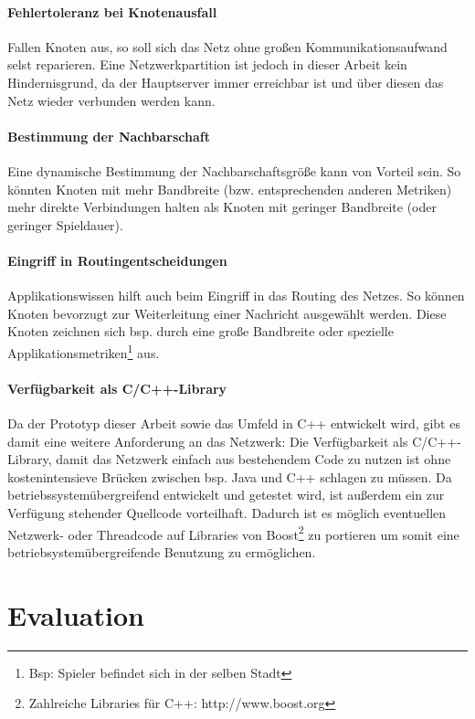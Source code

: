 
\paragraph{Fehlertoleranz bei Knotenausfall} Fallen Knoten aus, so soll sich das Netz ohne großen Kommunikationsaufwand selst reparieren. Eine Netzwerkpartition ist jedoch in dieser Arbeit kein Hindernisgrund, da der Hauptserver immer erreichbar ist und über diesen das Netz wieder verbunden werden kann.

\paragraph{Bestimmung der Nachbarschaft} Eine dynamische Bestimmung der Nachbarschaftsgröße kann von Vorteil sein. So könnten Knoten mit mehr Bandbreite (bzw. entsprechenden anderen Metriken) mehr direkte Verbindungen halten als Knoten mit geringer Bandbreite (oder geringer Spieldauer).

\paragraph{Eingriff in Routingentscheidungen} Applikationswissen hilft auch beim Eingriff in das Routing des Netzes. So können Knoten bevorzugt zur Weiterleitung einer Nachricht ausgewählt werden. Diese Knoten zeichnen sich bsp. durch eine große Bandbreite oder spezielle Applikationsmetriken\footnote{Bsp: Spieler befindet sich in der selben Stadt} aus.

\paragraph{Verfügbarkeit als C/C++-Library} Da der Prototyp dieser Arbeit sowie das Umfeld in C++ entwickelt wird, gibt es damit eine weitere Anforderung an das Netzwerk: Die Verfügbarkeit als C/C++-Library, damit das Netzwerk einfach aus bestehendem Code zu nutzen ist ohne kostenintensieve Brücken zwischen bsp. Java und C++ schlagen zu müssen. Da betriebssystemübergreifend entwickelt und getestet wird, ist außerdem ein zur Verfügung stehender Quellcode vorteilhaft. Dadurch ist es möglich eventuellen Netzwerk- oder Threadcode auf Libraries von Boost\footnote{Zahlreiche Libraries für C++: http://www.boost.org} zu portieren um somit eine betriebsystemübergreifende Benutzung zu ermöglichen.





\section{Evaluation}


\cite{Castro2003} %

\cite{Fahmy2003} %

\cite{citeulike:780210} %

\cite{Zhao2001} %
